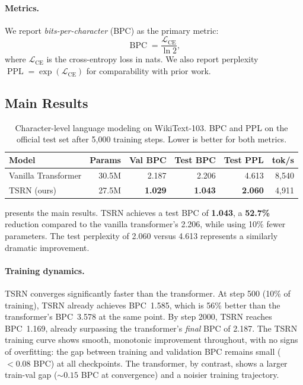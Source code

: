 \documentclass[11pt,a4paper]{article}
\DeclareMathOperator{\BPC}{BPC}
\DeclareMathOperator{\PPL}{PPL}
\begin{document}
\paragraph{Metrics.}
We report \emph{bits-per-character} (BPC) as the primary metric:
\begin{equation}
\BPC = \frac{\mathcal{L}_{\text{CE}}}{\ln 2},
\end{equation}
where $\mathcal{L}_{\text{CE}}$ is the cross-entropy loss in nats.
We also report perplexity $\PPL = \exp(\mathcal{L}_{\text{CE}})$ for
comparability with prior work.

\subsection{Main Results}
\label{sec:main_results}

\begin{table}[t]
\centering
\caption{Character-level language modeling on WikiText-103.
  BPC and PPL on the official test set after 5{,}000 training steps.
  Lower is better for both metrics.}
\label{tab:main}
\begin{tabular}{lrrrrr}
\toprule
\textbf{Model} & \textbf{Params} & \textbf{Val BPC} &
  \textbf{Test BPC} & \textbf{Test PPL} & \textbf{tok/s} \\
\midrule
Vanilla Transformer & 30.5M &
  2.187 & 2.206 & 4.613 & 8{,}540 \\
TSRN (ours)         & 27.5M &
  \textbf{1.029} & \textbf{1.043} & \textbf{2.060} & 4{,}911 \\
\bottomrule
\end{tabular}
\end{table}

 presents the main results.  TSRN achieves a test
BPC of \textbf{1.043}, a \textbf{52.7\%} reduction compared to the
vanilla transformer's 2.206, while using 10\% fewer parameters.
The test perplexity of 2.060 versus 4.613 represents a similarly
dramatic improvement.

\paragraph{Training dynamics.}
TSRN converges significantly faster than the transformer.
At step 500 (10\% of training), TSRN already achieves BPC~1.585,
which is 56\% better than the transformer's BPC~3.578 at the same
point.  By step 2000, TSRN reaches BPC~1.169, already surpassing
the transformer's \emph{final} BPC of 2.187.  The TSRN training
curve shows smooth, monotonic improvement throughout, with no signs
of overfitting: the gap between training and validation BPC remains
small ($< 0.08$ BPC) at all checkpoints.  The transformer, by
contrast, shows a larger train-val gap ($\sim 0.15$ BPC at
convergence) and a noisier training trajectory.
\end{document}

